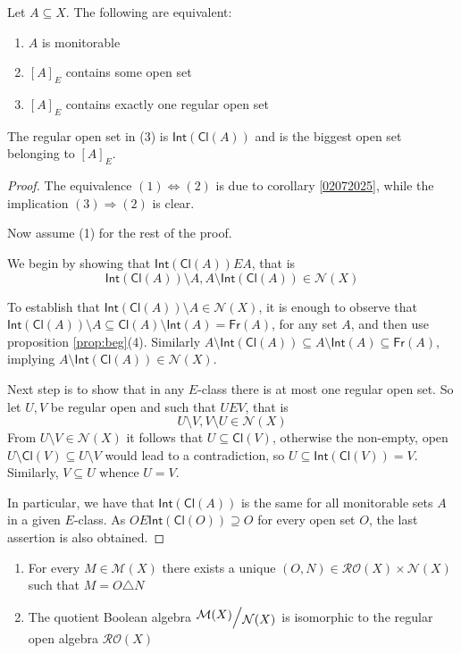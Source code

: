 \documentclass{lmcs}
\newcommand{\quot}[2]{{\raisebox{.2em}{$#1\!$}\left/\raisebox{-.2em}{$#2$}\right.}}
\newcommand{\Cl}[1]{\mathsf{Cl}(#1)}
\newcommand{\Int}[1]{\mathsf{Int}(#1)}
\newcommand{\Fr}[1]{\mathsf{Fr}(#1)}
\begin{document}
\begin{prop} \label{05072023}
Let $A\subseteq X$.
The following are equivalent:
\begin{enumerate}
\item $A$ is monitorable
\item $[A]_E$ contains some open set
\item $[A]_E$ contains exactly one regular open set
\end{enumerate}
The regular open set in (3) is $ \Int{ \Cl{A} } $ and is the biggest open set belonging to $[A]_E$.
\end{prop}

\begin{proof}
The equivalence $(1)\Leftrightarrow (2)$ is due to corollary \ref{02072025}, while the implication $(3)\Rightarrow (2)$ is clear.

Now assume (1) for the rest of the proof.

We begin by showing that $ \Int{ \Cl{A} } EA$, that is
\[
\Int{ \Cl{A} } \setminus A,A\setminus \Int{ \Cl{A} } \in \mathcal N (X)
\]

To establish that $\Int{ \Cl{A} } \setminus A\in \mathcal N (X)$, it is enough to observe that $ \Int{ \Cl{A} } \setminus A\subseteq \Cl{A} \setminus \Int{A} = \Fr{A} $, for any set $A$, and then use proposition \ref{prop:beg}(4).
Similarly $A\setminus \Int{ \Cl{A} } \subseteq A\setminus \Int{A} \subseteq \Fr{A} $, implying $A\setminus \Int{ \Cl{A} } \in \mathcal N (X)$.

Next step is to show that in any $E$-class there is at most one regular open set.
So let $U,V$ be regular open and such that $UEV$, that is
\[
U\setminus V,V\setminus U\in \mathcal N (X)
\]
From $U\setminus V\in \mathcal N (X)$ it follows that $U\subseteq \Cl{V} $, otherwise the non-empty, open $U\setminus \Cl{V}\subseteq U\setminus V$ would lead to a contradiction, so $U\subseteq \Int{ \Cl{V}} =V$.
Similarly, $V\subseteq U$ whence $U=V$.

In particular, we have that $ \Int{ \Cl{A} } $ is the same for all monitorable sets $A$ in a given $E$-class.
As $OE \Int{ \Cl{O} } \supseteq O$ for every open set $O$, the last assertion is also obtained.
\end{proof}

\begin{cor}
\begin{enumerate}
\item For every $M\in \mathcal M (X)$ there exists a unique $(O,N)\in \mathcal R \mathcal O (X)\times \mathcal N (X)$ such that $M=O\triangle N$
\item The quotient Boolean algebra $ \quot{ \mathcal M (X)}{ \mathcal N (X)} $ is isomorphic to the regular open algebra $ \mathcal R \mathcal O (X)$
\end{enumerate}
\end{cor}
\end{document}
